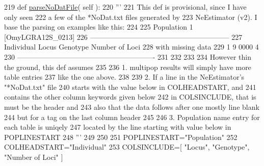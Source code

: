 \begin{DoxyCode}
219     \textcolor{keyword}{def }\hyperlink{classnegui_1_1pgoutputneestimator_1_1PGOutputNeEstimator_a4f8192c2aacf6e38b2c4c1d80302b643}{parseNoDatFile}( self ):
220         \textcolor{stringliteral}{'''}
221 \textcolor{stringliteral}{        This def is provisional, since I have only seen}
222 \textcolor{stringliteral}{        a few of the *NoDat.txt files generated by}
223 \textcolor{stringliteral}{        NeEstimator (v2). I base the parsing on examples like this:}
224 \textcolor{stringliteral}{}
225 \textcolor{stringliteral}{        Population 1 [OmyLGRA12S\_0213]  }
226 \textcolor{stringliteral}{        -----------------------------------------------------------}
227 \textcolor{stringliteral}{        Individual       Locus         Genotype     Number of Loci}
228 \textcolor{stringliteral}{                                          with missing data}
229 \textcolor{stringliteral}{               1            9             0000             4   }
230 \textcolor{stringliteral}{        ----------------------------------------------------------  }
231 \textcolor{stringliteral}{        }
232 \textcolor{stringliteral}{    }
233 \textcolor{stringliteral}{        }
234 \textcolor{stringliteral}{        However thin the ground, this def assumes}
235 \textcolor{stringliteral}{}
236 \textcolor{stringliteral}{        1. multipop results will simply have more table entries}
237 \textcolor{stringliteral}{        like the one above.}
238 \textcolor{stringliteral}{}
239 \textcolor{stringliteral}{        2. If a line in the NeEstimator's "*NoDat.txt" file}
240 \textcolor{stringliteral}{        starts with the value below in COLHEADSTART, and }
241 \textcolor{stringliteral}{        contains the other column keywords given below}
242 \textcolor{stringliteral}{        in COLSINCLUDE, that is must be the header and}
243 \textcolor{stringliteral}{        also that the data follows after one mostly line blank}
244 \textcolor{stringliteral}{        but for a tag on the last column header}
245 \textcolor{stringliteral}{}
246 \textcolor{stringliteral}{        3. Population name entry for each table is uniqely}
247 \textcolor{stringliteral}{        located by the line starting with value below in POPLINESTART}
248 \textcolor{stringliteral}{        '''}
249 
250 
251         POPLINESTART=\textcolor{stringliteral}{"Population"}
252         COLHEADSTART=\textcolor{stringliteral}{"Individual"}       
253         COLSINCLUDE=[ \textcolor{stringliteral}{"Locus"}, \textcolor{stringliteral}{"Genotype"}, \textcolor{stringliteral}{"Number of Loci"} ]

\end{DoxyCode}
